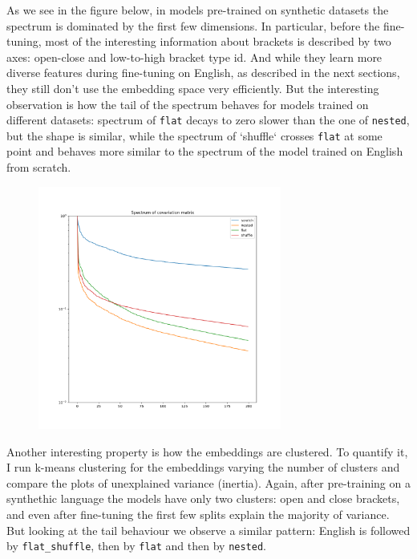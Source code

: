 \documentclass[a4paper, 11pt, oneside]{article}
\begin{document}
	As we see in the figure below, in models pre-trained on synthetic datasets the
	spectrum is dominated by the first few dimensions. In particular, before the fine-tuning,
	most of the interesting information about brackets is described by two axes: open-close
	and low-to-high bracket type id. And while they learn more diverse features
	during fine-tuning on English, as described in the next sections, they still
	don't use the embedding space very efficiently. But the interesting observation
	is how the tail of the spectrum behaves for models trained on different datasets:
	spectrum of \texttt{flat} decays to zero slower than the one of \texttt{nested},
	but the shape is similar, while the spectrum of `shuffle` crosses \texttt{flat}
	at some point and behaves more similar to the spectrum of the model trained on
	English from scratch.

	\begin{figure}[t]
		\includegraphics[width=8cm]{img/spectrum.png}
		\centering
	\end{figure}

	Another interesting property is how the embeddings are clustered. To quantify it,
	I run k-means clustering for the embeddings varying the number of clusters and
	compare the plots of unexplained variance (inertia). Again, after pre-training
	on a synthethic language the models have only two clusters: open and close brackets,
	and even after fine-tuning the first few splits explain the majority of
	variance. But looking at the tail behaviour we observe a similar pattern:
	English is followed by \texttt{flat\_shuffle}, then by \texttt{flat} and then by
	\texttt{nested}.
\end{document}
